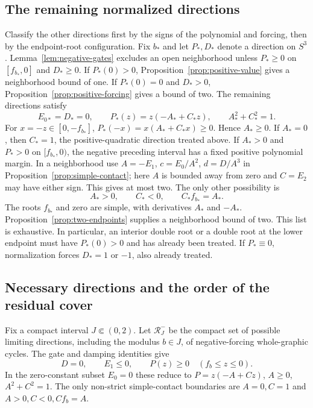 \subsection{The remaining normalized directions}
Classify the other directions first by the signs of the polynomial
and forcing, then by the endpoint-root configuration.
Fix $b_*$ and let $P_*,D_*$ denote a direction on $S^3$.
Lemma~\ref{lem:negative-gates} excludes an open neighborhood
unless $P_*\ge0$ on $[f_{b_*},0]$ and $D_*\ge0$.
If $P_*(0)>0$, Proposition~\ref{prop:positive-value} gives a
neighborhood bound of one. If $P_*(0)=0$ and $D_*>0$,
Proposition~\ref{prop:positive-forcing} gives a bound of two.
The remaining directions satisfy
\begin{equation}\label{eq:remaining-polynomial}
 E_{0*}=D_*=0,\qquad
 P_*(z)=z(-A_*+C_*z),\qquad A_*^2+C_*^2=1.
\end{equation}
For $x=-z\in[0,-f_{b_*}]$,
$P_*(-x)=x(A_*+C_*x)\ge0$. Hence $A_*\ge0$. If $A_*=0$,
then $C_*=1$, the positive-quadratic direction treated above. If $A_*>0$ and
$P_*>0$ on $[f_{b_*},0)$, the negative preceding interval has
a fixed positive polynomial margin. In a neighborhood use
$A=-E_1$, $c=E_0/A^2$, $d=D/A^3$ in
Proposition~\ref{prop:simple-contact}; here $A$ is bounded away
from zero and $C=E_2$ may have either sign. This gives at most two.
The only other possibility is
\[
 A_*>0,\qquad C_*<0,\qquad C_*f_{b_*}=A_*.
\]
The roots $f_{b_*}$ and zero are simple, with derivatives $A_*$
and $-A_*$. Proposition~\ref{prop:two-endpoints} supplies a
neighborhood bound of two. This list is exhaustive. In particular,
an interior double root or a double root at the lower endpoint must
have $P_*(0)>0$ and has already been treated. If $P_*\equiv0$,
normalization forces $D_*=1$ or $-1$, also already treated.

\subsection{Necessary directions and the order of the residual cover}
\label{sec:effective-residual-cover}
Fix a compact interval $J\Subset(0,2)$.
Let $\mathcal R_J^-$ be the compact set of possible limiting
directions, including the modulus $b\in J$, of negative-forcing
whole-graphic cycles. The gate and damping identities give
\[
 D=0,\qquad E_1\le0,\qquad
 P(z)\ge0\quad(f_b\le z\le0).
\]
In the zero-constant subset $E_0=0$ these reduce to
$P=z(-A+Cz)$, $A\ge0$, $A^2+C^2=1$.
The only non-strict simple-contact boundaries are $A=0,C=1$
and $A>0,C<0,Cf_b=A$.

